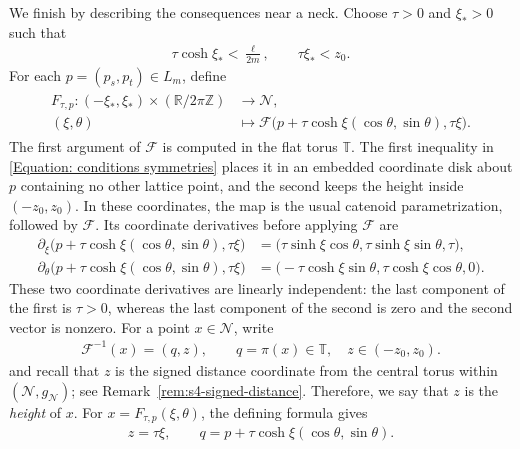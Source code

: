 \documentclass[a4paper,11pt,oneside,reqno]{amsart}
\numberwithin{equation}{section}
\theoremstyle{definition}
\begin{document}
We finish by describing the consequences near a neck.
Choose $\tau>0$ and $\xi_*>0$ such that
%
\begin{align}\label{Equation: conditions symmetries}
    \tau\cosh\xi_*<\frac{\ell}{2m},
    \qquad
    \tau\xi_*<z_0.
\end{align}
%
For each $p=(p_s,p_t)\in L_m$, define
%
\begin{align}
    \label{eq:s4-symmetry-neck-map}
    \begin{split}
        F_{\tau,p}:
        (-\xi_*,\xi_*)\times(\mathbb R/2\pi\mathbb Z)
        &\rightarrow\mathcal N,\\
        (\xi,\theta)
        &\mapsto
        \mathcal F\bigl(
        p+\tau\cosh\xi(\cos\theta,\sin\theta),\tau\xi
        \bigr).
    \end{split}
\end{align}
%
The first argument of $\mathcal F$ is computed in the
flat torus $\mathbb T$. The first inequality in \eqref{Equation: conditions symmetries} places it
in an embedded coordinate disk about $p$ containing no
other lattice point, and the second keeps the height
inside $(-z_0,z_0)$. In these coordinates, the map is the usual catenoid parametrization, followed by $\mathcal F$. Its coordinate derivatives before applying $\mathcal F$
are
%
\begin{align*}
    \partial_\xi
    \bigl(p+\tau\cosh\xi(\cos\theta,\sin\theta),\tau\xi\bigr)
    &=
    \bigl(\tau\sinh\xi\cos\theta,
    \tau\sinh\xi\sin\theta,\tau\bigr),\\
    \partial_\theta
    \bigl(p+\tau\cosh\xi(\cos\theta,\sin\theta),\tau\xi\bigr)
    &=
    \bigl(-\tau\cosh\xi\sin\theta,
    \tau\cosh\xi\cos\theta,0\bigr).
\end{align*}
%
These two coordinate derivatives are linearly independent:
the last component of the first is $\tau>0$, whereas
the last component of the second is zero and the second
vector is nonzero. For a point $x\in\mathcal N$, write
%
\begin{align*}
    \mathcal F^{-1}(x)=(q,z),
    \qquad q=\pi(x)\in\mathbb T,\quad z\in(-z_0,z_0).
\end{align*}
%
and recall that $z$ is the signed distance coordinate
from the central torus within $(\mathcal N,g_{\mathcal N})$;
see Remark~\ref{rem:s4-signed-distance}. Therefore, we say that $z$ is the \textit{height} of $x$. For $x=F_{\tau,p}(\xi,\theta)$, the defining formula gives
%
\begin{align*}
    z=\tau\xi,
    \qquad
    q=p+\tau\cosh\xi(\cos\theta,\sin\theta).
\end{align*}
\end{document}

